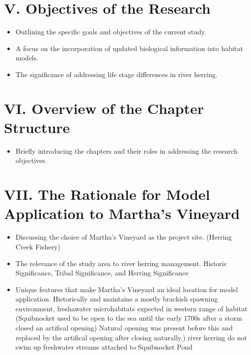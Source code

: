 \documentclass[
]{book}
\providecommand{\tightlist}{%
  \setlength{\itemsep}{0pt}\setlength{\parskip}{0pt}}
\begin{document}
\hypertarget{v.-objectives-of-the-research}{%
\section{V. Objectives of the Research}\label{v.-objectives-of-the-research}}

\begin{itemize}
\tightlist
\item
  Outlining the specific goals and objectives of the current study.
\item
  A focus on the incorporation of updated biological information into habitat models.
\item
  The significance of addressing life stage differences in river herring.
\end{itemize}

\hypertarget{vi.-overview-of-the-chapter-structure}{%
\section{VI. Overview of the Chapter Structure}\label{vi.-overview-of-the-chapter-structure}}

\begin{itemize}
\tightlist
\item
  Briefly introducing the chapters and their roles in addressing the research objectives.
\end{itemize}

\hypertarget{vii.-the-rationale-for-model-application-to-marthas-vineyard}{%
\section{VII. The Rationale for Model Application to Martha's Vineyard}\label{vii.-the-rationale-for-model-application-to-marthas-vineyard}}

\begin{itemize}
\tightlist
\item
  Discussing the choice of Martha's Vineyard as the project site.
  (Herring Creek Fishery)
\item
  The relevance of the study area to river herring management.
  Historic Significance, Tribal Significance, and Herring Significance
\item
  Unique features that make Martha's Vineyard an ideal location for model application.
  Historically and maintains a mostly brackish spawning environment, freshawater microhabitats expected in western range of habitat
  (Squibnocket used to be open to the sea until the early 1700s after a storm closed an artifical opening) Natural opening was present before this and replaced by the artifical opening after closing naturally.)
  river herring do not swim up freshwater streams attached to Squibnocket Pond
\end{itemize}
\end{document}
